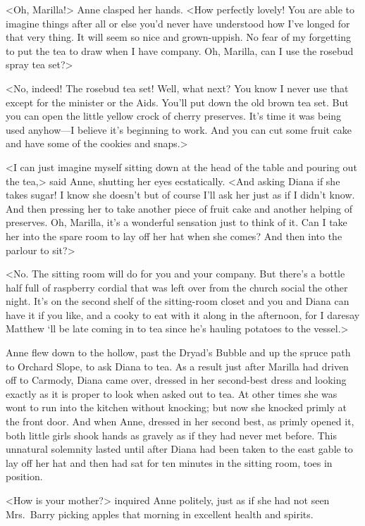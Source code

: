 <Oh, Marilla!> Anne clasped her hands. <How perfectly lovely! You are able to imagine things after all or else you'd never have understood how I've longed for that very thing. It will seem so nice and grown-uppish. No fear of my forgetting to put the tea to draw when I have company. Oh, Marilla, can I use the rosebud spray tea set?>

<No, indeed! The rosebud tea set! Well, what next? You know I never use that except for the minister or the Aids. You'll put down the old brown tea set. But you can open the little yellow crock of cherry preserves. It's time it was being used anyhow—I believe it's beginning to work. And you can cut some fruit cake and have some of the cookies and snaps.>

<I can just imagine myself sitting down at the head of the table and pouring out the tea,> said Anne, shutting her eyes ecstatically. <And asking Diana if she takes sugar! I know she doesn't but of course I'll ask her just as if I didn't know. And then pressing her to take another piece of fruit cake and another helping of preserves. Oh, Marilla, it's a wonderful sensation just to think of it. Can I take her into the spare room to lay off her hat when she comes? And then into the parlour to sit?>

<No. The sitting room will do for you and your company. But there's a bottle half full of raspberry cordial that was left over from the church social the other night. It's on the second shelf of the sitting-room closet and you and Diana can have it if you like, and a cooky to eat with it along in the afternoon, for I daresay Matthew `ll be late coming in to tea since he's hauling potatoes to the vessel.>

Anne flew down to the hollow, past the Dryad's Bubble and up the spruce path to Orchard Slope, to ask Diana to tea. As a result just after Marilla had driven off to Carmody, Diana came over, dressed in her second-best dress and looking exactly as it is proper to look when asked out to tea. At other times she was wont to run into the kitchen without knocking; but now she knocked primly at the front door. And when Anne, dressed in her second best, as primly opened it, both little girls shook hands as gravely as if they had never met before. This unnatural solemnity lasted until after Diana had been taken to the east gable to lay off her hat and then had sat for ten minutes in the sitting room, toes in position.

<How is your mother?> inquired Anne politely, just as if she had not seen Mrs.~Barry picking apples that morning in excellent health and spirits.

